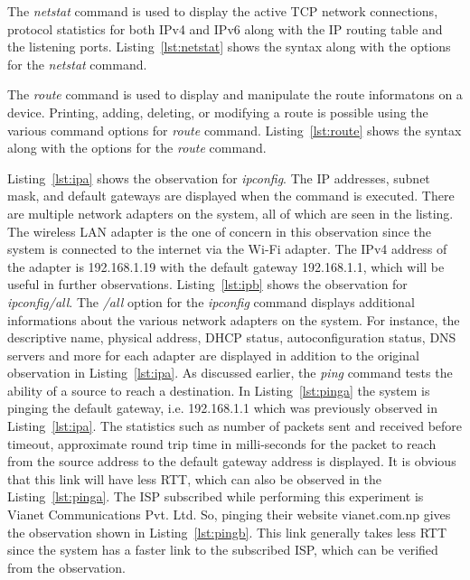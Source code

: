 \documentclass{lab_sheet}
\newcommand{\syntax}[1]{
    
}
\begin{document}
    The \textit{netstat} command is used to display the active TCP network connections, protocol statistics for both IPv4 and IPv6 along with the IP routing table and the listening ports. Listing~\ref{lst:netstat} shows the syntax along with the options for the \textit{netstat} command.
    \syntax{netstat}
    The \textit{route} command is used to display and manipulate the route informatons on a device. Printing, adding, deleting, or modifying a route is possible using the various command options for \textit{route} command. Listing~\ref{lst:route} shows the syntax along with the options for the \textit{route} command.
    \syntax{route}
    Listing~\ref{lst:ipa} shows the observation for \textit{ipconfig}. The IP addresses, subnet mask, and default gateways are displayed when the command is executed. There are multiple network adapters on the system, all of which are seen in the listing. The wireless LAN adapter is the one of concern in this observation since the system is connected to the internet via the Wi-Fi adapter. The IPv4 address of the adapter is 192.168.1.19 with the default gateway 192.168.1.1, which will be useful in further observations.
    Listing~\ref{lst:ipb} shows the observation for \textit{ipconfig/all}. The \textit{/all} option for the \textit{ipconfig} command displays additional informations about the various network adapters on the system. For instance, the descriptive name, physical address, DHCP status, autoconfiguration status, DNS servers and more for each adapter are displayed in addition to the original observation in Listing~\ref{lst:ipa}.
    As discussed earlier, the \textit{ping} command tests the ability of a source to reach a destination. In Listing~\ref{lst:pinga} the system is pinging the default gateway, i.e. 192.168.1.1 which was previously observed in Listing~\ref{lst:ipa}. The statistics such as number of packets sent and received before timeout, approximate round trip time in milli-seconds for the packet to reach from the source address to the default gateway address is displayed. It is obvious that this link will have less RTT, which can also be observed in the Listing~\ref{lst:pinga}.
    The ISP subscribed while performing this experiment is Vianet Communications Pvt. Ltd. So, pinging their website vianet.com.np gives the observation shown in Listing~\ref{lst:pingb}. This link generally takes less RTT since the system has a faster link to the subscribed ISP, which can be verified from the observation.
\end{document}

